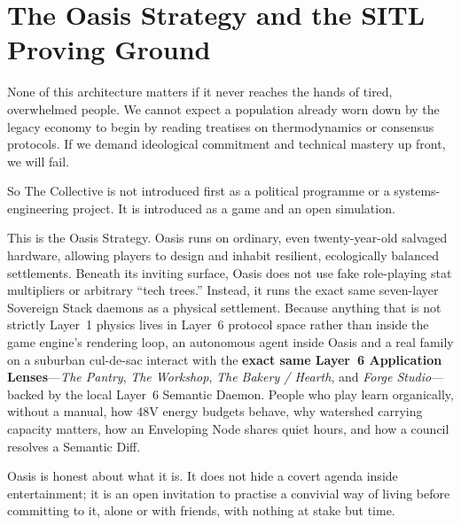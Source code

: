 \section{The Oasis Strategy and the SITL Proving Ground}

None of this architecture matters if it never reaches the hands of tired, overwhelmed people. We cannot expect a population already worn down by the legacy economy to begin by reading treatises on thermodynamics or consensus protocols. If we demand ideological commitment and technical mastery up front, we will fail.

So The Collective is not introduced first as a political programme or a systems-engineering project. It is introduced as a game and an open simulation.

This is the Oasis Strategy. Oasis runs on ordinary, even twenty-year-old salvaged hardware, allowing players to design and inhabit resilient, ecologically balanced settlements. Beneath its inviting surface, Oasis does not use fake role-playing stat multipliers or arbitrary ``tech trees.'' Instead, it runs the exact same seven-layer Sovereign Stack daemons as a physical settlement. Because anything that is not strictly Layer~1 physics lives in Layer~6 protocol space rather than inside the game engine's rendering loop, an autonomous agent inside Oasis and a real family on a suburban cul-de-sac interact with the \textbf{exact same Layer~6 Application Lenses}---\textit{The Pantry}, \textit{The Workshop}, \textit{The Bakery / Hearth}, and \textit{Forge Studio}---backed by the local Layer~6 Semantic Daemon. People who play learn organically, without a manual, how 48V energy budgets behave, why watershed carrying capacity matters, how an Enveloping Node shares quiet hours, and how a council resolves a Semantic Diff.

Oasis is honest about what it is. It does not hide a covert agenda inside entertainment; it is an open invitation to practise a convivial way of living before committing to it, alone or with friends, with nothing at stake but time.

